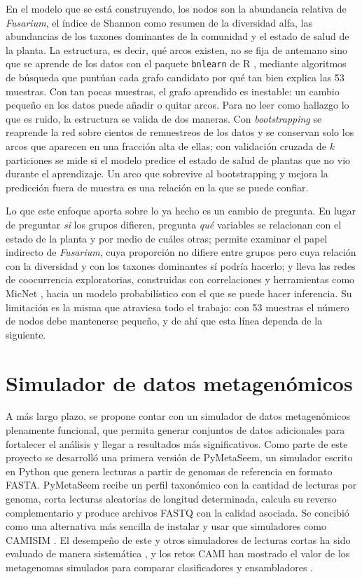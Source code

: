En el modelo que se está construyendo, los nodos son la abundancia relativa de \textit{Fusarium},
el índice de Shannon como resumen de la diversidad alfa, las abundancias de los taxones dominantes
de la comunidad y el estado de salud de la planta. La estructura, es decir, qué arcos existen, no
se fija de antemano sino que se aprende de los datos con el paquete \texttt{bnlearn} de R
\citep{scutari2010bnlearn}, mediante algoritmos de búsqueda que puntúan cada grafo candidato por
qué tan bien explica las 53 muestras. Con tan pocas muestras, el grafo aprendido es inestable: un
cambio pequeño en los datos puede añadir o quitar arcos. Para no leer como hallazgo lo que es
ruido, la estructura se valida de dos maneras. Con \emph{bootstrapping} se reaprende la red sobre
cientos de remuestreos de los datos y se conservan solo los arcos que aparecen en una fracción alta
de ellas; con validación cruzada de $k$ particiones se mide si el modelo predice el estado de salud
de plantas que no vio durante el aprendizaje. Un arco que sobrevive al bootstrapping y mejora la
predicción fuera de muestra es una relación en la que se puede confiar.

Lo que este enfoque aporta sobre lo ya hecho es un cambio de pregunta. En lugar de preguntar
\emph{si} los grupos difieren, pregunta \emph{qué} variables se relacionan con el estado de la
planta y por medio de cuáles otras; permite examinar el papel indirecto de \textit{Fusarium}, cuya
proporción no difiere entre grupos pero cuya relación con la diversidad y con los taxones dominantes
sí podría hacerlo; y lleva las redes de coocurrencia exploratorias, construidas con correlaciones y
herramientas como MicNet \citep{favila2022micnet}, hacia un modelo probabilístico con el que se
puede hacer inferencia. Su limitación es la misma que atraviesa todo el trabajo: con 53 muestras el
número de nodos debe mantenerse pequeño, y de ahí que esta línea dependa de la siguiente.

\section{Simulador de datos metagenómicos}

A más largo plazo, se propone contar con un simulador de datos metagenómicos plenamente funcional,
que permita generar conjuntos de datos adicionales para fortalecer el análisis y llegar a
resultados más significativos. Como parte de este proyecto se desarrolló una primera versión de
PyMetaSeem, un simulador escrito en Python que genera lecturas a partir de genomas de referencia en
formato FASTA. PyMetaSeem recibe un perfil taxonómico con la cantidad de lecturas por genoma, corta
lecturas aleatorias de longitud determinada, calcula su reverso complementario y produce archivos
FASTQ con la calidad asociada. Se concibió como una alternativa más sencilla de instalar y usar que
simuladores como CAMISIM \citep{fritz2019camisim}. El desempeño de este y otros simuladores de
lecturas cortas ha sido evaluado de manera sistemática \citep{milhaven2023performance}, y los retos
CAMI han mostrado el valor de los metagenomas simulados para comparar clasificadores y ensambladores
\citep{meyer2022critical}.

